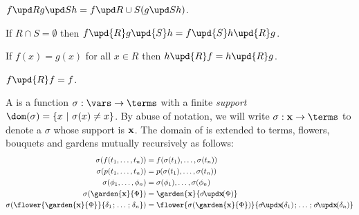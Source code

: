 \begin{scope}
\begin{fact}[Associativity]
  $\update{\update{f}{R}{g}}{S}{h} = \update{f}{R \cup S}{(\update{g}{S}{h})}$.
\end{fact}

\begin{fact}[Commutativity]
  If $R \cap S = \emptyset$ then $f \upd{R} g \upd{S} h = f \upd{S} h \upd{R}
  g$.
\end{fact}

\begin{fact}[Agreement]
  If $f(x) = g(x)$ for all $x \in R$ then $h \upd{R} f = h \upd{R} g$.
\end{fact}

\begin{fact}[Idempotency]
  $f \upd{R} f = f$.
\end{fact}

\begin{definition}[Substitution]
  A  is a function $\sigma : \vars \to \terms$ with a finite
  \emph{support} $\dom(\sigma) = \compr{x}{\sigma(x) \not= x}$. By abuse of
  notation, we will write $\sigma : \bx \to \terms$ to denote a 
  $\sigma$ whose support is $\mathbf{x}$. The domain of  is extended to
  terms, flowers, bouquets and gardens mutually recursively as follows:
  \begin{align*}
    \sigma(f(t_1, \ldots, t_n)) &= f(\sigma(t_1), \ldots, \sigma(t_n)) \\
    \sigma(p(t_1, \ldots, t_n)) &= p(\sigma(t_1), \ldots, \sigma(t_n)) \\
    \sigma(\phi_1, \ldots, \phi_n) &= \sigma(\phi_1), \ldots, \sigma(\phi_n) \\
    \sigma(\garden{\mathbf{x}}{\Phi}) &=
      \garden{\mathbf{x}}{\restr{\sigma}{\mathbf{x}}(\Phi)} \\
    \sigma(\flower{\garden{\mathbf{x}}{\Phi}}{\delta_1 \sep \ldots \sep \delta_n}) &=
      \flower{\sigma(\garden{\mathbf{x}}{\Phi})}{\restr{\sigma}{\mathbf{x}}(\delta_1) \sep \ldots \sep \restr{\sigma}{\mathbf{x}}(\delta_n)}
  \end{align*}

\end{definition}


\end{scope}
